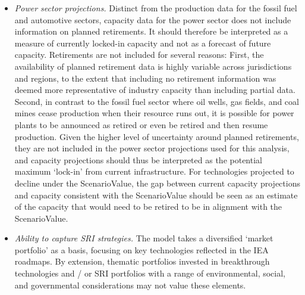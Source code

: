 \documentclass[10pt,table,a4]{article}\usepackage[]{graphicx}\usepackage[]{color}
\begin{document}
\begin{multicols}{2}
\begin{itemize}
			\item{\textit{Power sector projections.} Distinct from the production data for the fossil fuel and automotive sectors, capacity data for the power sector does not include information on planned retirements. It should therefore be interpreted as a measure of currently locked-in capacity and not as a forecast of future capacity. Retirements are not included for several reasons: First, the availability of planned retirement data is highly variable across jurisdictions and regions, to the extent that including no retirement information was deemed more representative of industry capacity than including partial data. Second, in contrast to the fossil fuel sector where oil wells, gas fields, and coal mines cease production when their resource runs out, it is possible for power plants to be announced as retired or even be retired and then resume production. Given the higher level of uncertainty around planned retirements, they are not included in the power sector projections used for this analysis, and capacity projections should thus be interpreted as the potential maximum `lock-in' from current infrastructure. For technologies projected to decline under the ScenarioValue, the gap between current capacity projections and capacity consistent with the ScenarioValue should be seen as an estimate of the capacity that would need to be retired to be in alignment with the ScenarioValue.} 
			
			\item{\textit{Ability to capture SRI strategies. }The model takes a diversified `market portfolio' as a basis, focusing on key technologies reflected in the IEA roadmaps. By extension, thematic portfolios invested in breakthrough technologies and / or SRI portfolios with a range of environmental, social, and governmental considerations may not value these elements.}
		\end{itemize}
		
		
	\end{multicols}
	\newpage		
	
\end{document}

